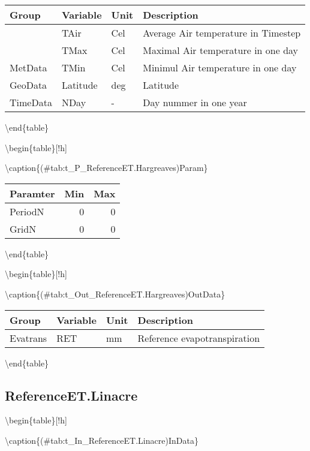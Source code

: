 \documentclass[
]{book}
\begin{document}
\begin{tabular}[t]{l|l|l|l}
\hline
Group & Variable & Unit & Description\\
\hline
 & TAir & Cel & Average Air temperature in Timestep\\
\cline{2-4}
 & TMax & Cel & Maximal Air temperature in one day\\
\cline{2-4}
\multirow{-3}{*}{\raggedright\arraybackslash MetData} & TMin & Cel & Minimul Air temperature in one day\\
\cline{1-4}
GeoData & Latitude & deg & Latitude\\
\cline{1-4}
TimeData & NDay & - & Day nummer in one year\\
\hline
\end{tabular}

\textbackslash end\{table\}

\textbackslash begin\{table\}{[}!h{]}

\textbackslash caption\{(\#tab:t\_P\_ReferenceET.Hargreaves)Param\}
\centering

\begin{tabular}[t]{l|r|r}
\hline
Paramter & Min & Max\\
\hline
PeriodN & 0 & 0\\
\cline{1-3}
GridN & 0 & 0\\
\hline
\end{tabular}

\textbackslash end\{table\}

\textbackslash begin\{table\}{[}!h{]}

\textbackslash caption\{(\#tab:t\_Out\_ReferenceET.Hargreaves)OutData\}
\centering

\begin{tabular}[t]{l|l|l|l}
\hline
Group & Variable & Unit & Description\\
\hline
Evatrans & RET & mm & Reference evapotranspiration\\
\hline
\end{tabular}

\textbackslash end\{table\}

\hypertarget{referenceet.linacre}{%
\subsection{ReferenceET.Linacre}\label{referenceet.linacre}}

\textbackslash begin\{table\}{[}!h{]}

\textbackslash caption\{(\#tab:t\_In\_ReferenceET.Linacre)InData\}
\centering
\end{document}
